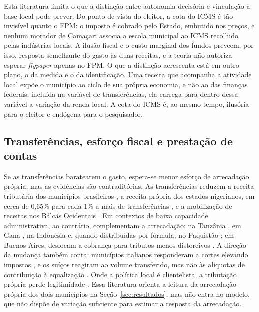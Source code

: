 Esta literatura limita o que a distinção entre autonomia decisória e vinculação à base local pode prever. Do ponto de vista do eleitor, a cota do ICMS é tão invisível quanto o FPM: o imposto é cobrado pelo Estado, embutido nos preços, e nenhum morador de Camaçari associa a escola municipal ao ICMS recolhido pelas indústrias locais. A ilusão fiscal e o custo marginal dos fundos preveem, por isso, resposta semelhante do gasto às duas receitas, e a teoria não autoriza esperar \textit{flypaper} apenas no FPM. O que a distinção acrescenta está em outro plano, o da medida e o da identificação. Uma receita que acompanha a atividade local expõe o município ao ciclo de sua própria economia, e não ao das finanças federais; incluída na variável de transferências, ela carrega para dentro dessa variável a variação da renda local. A cota do ICMS é, ao mesmo tempo, ilusória para o eleitor e endógena para o pesquisador.

\subsection{Transferências, esforço fiscal e prestação de contas}\label{sec:esforco}

Se as transferências baratearem o gasto, espera-se menor esforço de arrecadação própria, mas as evidências são contraditórias. As transferências reduzem a receita tributária dos municípios brasileiros \citep{DaCosta2016}, a receita própria dos estados nigerianos, em cerca de 0,65\% para cada 1\% a mais de transferências \citep{Taiwo202231}, e a mobilização de receitas nos Bálcãs Ocidentais \citep{Andonova20237}. Em contextos de baixa capacidade administrativa, ao contrário, complementam a arrecadação: na Tanzânia \citep{Masaki2018173}, em Gana \citep{Adanu2024157}, na Indonésia \citep{Saptono2023782, Lewis2017111} e, quando distribuídas por fórmula, no Paquistão \citep{Yousaf20223}; em Buenos Aires, deslocam a cobrança para tributos menos distorcivos \citep{Porto2023642}. A direção da mudança também conta: municípios italianos responderam a cortes elevando impostos \citep{Marattin2022834}, e os suíços reagiram ao volume transferido, mas não às alíquotas de contribuição à equalização \citep{Mauri2025}. Onde a política local é clientelista, a tributação própria perde legitimidade \citep{Crook201715}. Essa literatura orienta a leitura da arrecadação própria dos dois municípios na Seção~\ref{sec:resultados}, mas não entra no modelo, que não dispõe de variação suficiente para estimar a resposta da arrecadação.

